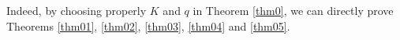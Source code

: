 \documentclass[12pt,reqno]{amsart}
\numberwithin{equation}{section}
\newtheorem{theorem}{Theorem}[section]
\theoremstyle{definition}
\theoremstyle{remark}
\begin{document}

Indeed, by choosing properly $ K $ and $ q $ in Theorem \ref{thm0}, we can directly prove Theorems \ref{thm01}, \ref{thm02}, \ref{thm03}, \ref{thm04} and \ref{thm05}. 
\end{document}
